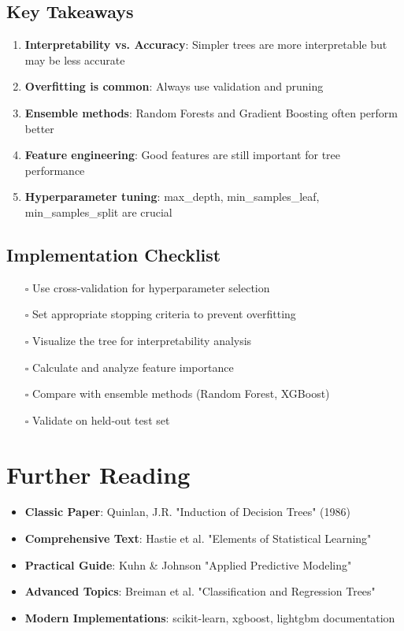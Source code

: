 \documentclass{article}
\begin{document}
\subsection{Key Takeaways}

\begin{enumerate}
    \item \textbf{Interpretability vs. Accuracy}: Simpler trees are more interpretable but may be less accurate
    \item \textbf{Overfitting is common}: Always use validation and pruning
    \item \textbf{Ensemble methods}: Random Forests and Gradient Boosting often perform better
    \item \textbf{Feature engineering}: Good features are still important for tree performance
    \item \textbf{Hyperparameter tuning}: max\_depth, min\_samples\_leaf, min\_samples\_split are crucial
\end{enumerate}

\subsection{Implementation Checklist}

\begin{itemize}
    \item[$\square$] Use cross-validation for hyperparameter selection
    \item[$\square$] Set appropriate stopping criteria to prevent overfitting  
    \item[$\square$] Visualize the tree for interpretability analysis
    \item[$\square$] Calculate and analyze feature importance
    \item[$\square$] Compare with ensemble methods (Random Forest, XGBoost)
    \item[$\square$] Validate on held-out test set
\end{itemize}

\section{Further Reading}

\begin{itemize}
    \item \textbf{Classic Paper}: Quinlan, J.R. "Induction of Decision Trees" (1986)
    \item \textbf{Comprehensive Text}: Hastie et al. "Elements of Statistical Learning"
    \item \textbf{Practical Guide}: Kuhn \& Johnson "Applied Predictive Modeling"
    \item \textbf{Advanced Topics}: Breiman et al. "Classification and Regression Trees"
    \item \textbf{Modern Implementations}: scikit-learn, xgboost, lightgbm documentation
\end{itemize}
\end{document}
